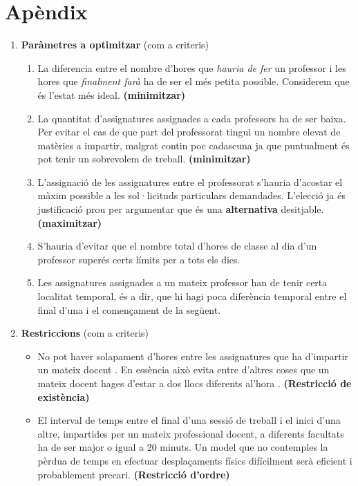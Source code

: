 \documentclass[10pt,twocolumn]{article}
\begin{document}
\section*{Apèndix}
\begin{enumerate}
	\item \textbf{Paràmetres a optimitzar } (com a criteris) 
	\begin{enumerate}
		\item La diferencia entre el nombre d'hores que \textit{hauria de fer} un professor i les hores que \textit{finalment farà} ha de ser el més petita possible. {\color{gray} Considerem que és l'estat més ideal.} \textbf{(minimitzar)} 
		\item La quantitat d'assignatures assignades a cada professors ha de ser baixa. 
		{\color{gray}  Per evitar el cas de que part del professorat tingui un nombre elevat de matèries a impartir, malgrat contin poc cadascuna ja que puntualment és pot tenir un sobrevolem de treball.} \textbf{(minimitzar)}
		\item L'assignació de les assignatures entre el professorat s'hauria d'acostar el màxim possible a les sol·licituds particulars demandades. {\color{gray}  L'elecció ja és justificació prou per argumentar que és una \textbf{alternativa} desitjable.} \textbf{(maximitzar)}
		\item S'hauria d'evitar que el nombre total d'hores de classe al dia d'un professor superés certs límits per a tots els dies.
		\item Les assignatures assignades a un mateix professor han de tenir certa localitat temporal, és a dir, que hi hagi poca diferència temporal entre el final d'una i el començament de la següent.
	\end{enumerate}
	\item \textbf{Restriccions} (com a criteris)
	\begin{itemize}
		\item No pot haver solapament d'hores entre les assignatures que ha d'impartir un mateix docent . {\color{gray} En essència això evita entre d'altres coses que un mateix docent hages d'estar a dos llocs diferents al'hora .} \textbf{(Restricció de existència)} 
		\item El interval de temps entre el final d'una sessió de treball i el inici d'una altre, impartides per un mateix professional docent, a diferents facultats ha de ser major o igual a 20 minuts. {\color{gray} Un model que no contemples la pèrdua de temps en efectuar desplaçaments físics difícilment serà eficient i probablement precari.} \textbf{(Restricció d'ordre)} 

\end{itemize}
\end{enumerate}
\end{document}
